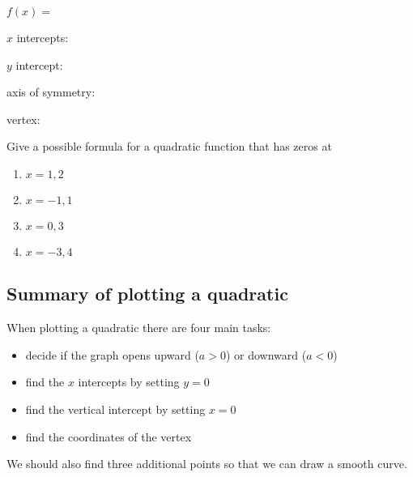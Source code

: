 \begin{minipage}{.5\textwidth}
\end{minipage}%
\hfill
\begin{minipage}{.4\textwidth}
	$f(x)=$ 
			
	$x$ intercepts:  
			
	$y$ intercept:  
			
	axis of symmetry:  
			
	vertex:  
\end{minipage}

\begin{myexample}
\drillandskill
Give a possible formula for a quadratic function that has zeros at
\begin{enumerate}
	\item $x=1,2$ 
	\item $x=-1,1$  
	\item $x=0,3$ 
	\item $x=-3,4$ 
\end{enumerate}
\end{myexample}

\subsection{Summary of plotting a quadratic}
When plotting a quadratic there are four main tasks:
\begin{itemize}
	\item decide if the graph opens upward ($a>0$) or downward ($a<0$)
	\item find the $x$ intercepts by setting $y=0$
	\item find the vertical intercept by setting $x=0$
	\item find the coordinates of the vertex
\end{itemize} 
We should also find three additional points so that we can draw a smooth curve. 
